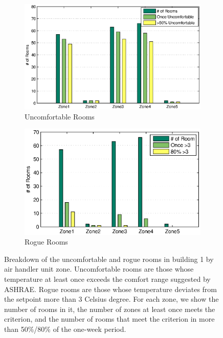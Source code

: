 \begin{figure}[ht!]
\centering
	\begin{subfigure}{0.48\textwidth}
                \centering
		\includegraphics[width=\textwidth]{./figs/uncmft_soda.eps}
                \caption{Uncomfortable Rooms}
                \label{fig:soda_zone1}
	\end{subfigure}
	\begin{subfigure}{0.48\textwidth}
                \centering
		\includegraphics[width=\textwidth]{./figs/rogue_soda.eps}
                \caption{Rogue Rooms}
                \label{fig:soda_zone2}

	\end{subfigure}
\caption{Breakdown of the uncomfortable and rogue rooms in building 1 by air handler unit zone. Uncomfortable rooms are those whose temperature at least once exceeds the comfort range suggested by ASHRAE. Rogue rooms are those whose temperature deviates from the setpoint more than 3 Celsius degree. For each zone, we show the number of rooms in it, the number of zones at least once meets the criterion, and the number of rooms that meet the criterion in more than 50\%/80\% of the one-week period.}
\end{figure}

